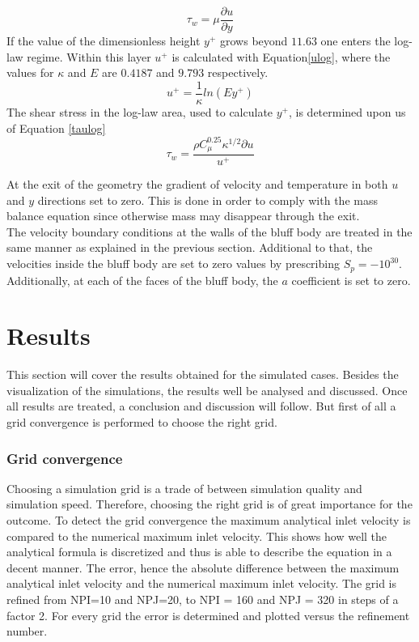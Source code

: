 \documentclass{CFD2017}
\begin{document}
\begin{equation}
\label{subtau}
\tau_w = \mu \frac{\partial u}{\partial y}
\end{equation}
If the value of the dimensionless height $y^+$ grows beyond $11.63$ one enters the log-law regime. Within this layer $u^+$ is calculated with Equation\ref{ulog}, where the values for $\kappa$ and $E$ are $0.4187$ and $9.793$ respectively.
\begin{equation}
\label{ulog}
u^+=\frac{1}{\kappa}ln(Ey^+)
\end{equation}
The shear stress in the log-law area, used to calculate $y^+$, is determined upon us of Equation \ref{taulog}
\begin{equation}
\label{taulog}
\tau_w = \frac{\rho C_{\mu}^{0.25}\kappa^{1/2}\partial u}{u^+}
\end{equation}


 At the exit of the geometry the gradient of velocity and temperature in both $u$ and $y$ directions set to zero. This is done in order to comply with the mass balance equation since otherwise mass may disappear through the exit.\\

The velocity boundary conditions at the walls of the bluff body are treated in the same manner as explained in the previous section. Additional to that, the velocities inside the bluff body are set to zero values by prescribing $S_p=-10^{30}$. Additionally, at each of the faces of the bluff body, the $a$ coefficient is set to zero. \\


\section{Results}
This section will cover the results obtained for the simulated cases. Besides the visualization of the simulations, the results well be analysed and discussed. Once all results are treated, a conclusion and discussion will follow. But first of all a grid convergence is performed to choose the right grid.\\
\subsubsection{Grid convergence}
Choosing a simulation grid is a trade of between simulation quality and simulation speed. Therefore, choosing the right grid is of great importance for the outcome. To detect the grid convergence the maximum analytical inlet velocity is compared to the numerical maximum inlet velocity. This shows how well the analytical formula is discretized and thus is able to describe the equation in a decent manner. The error, hence the absolute difference between the maximum analytical inlet velocity and the numerical maximum inlet velocity. The grid is refined from NPI=10 and NPJ=20, to NPI = 160 and NPJ = 320 in steps of a factor 2. For every grid the error is determined and plotted versus the refinement number.
\end{document}
